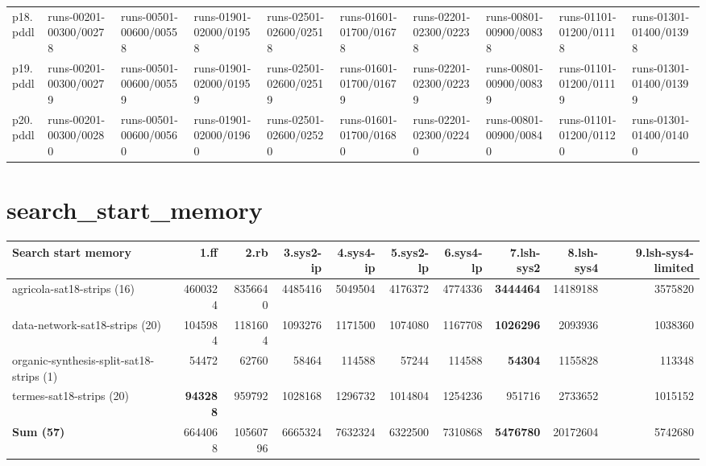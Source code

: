\documentclass{article}
\newcommand{\numtasks}[1]{\small{(#1)}}
\begin{document}
\begin{tabular}{@{}lrrrrrrrrr@{}}
p18.pddl & \multicolumn{1}{|l|}{runs-00201-00300/00278} & \multicolumn{1}{|l|}{runs-00501-00600/00558} & \multicolumn{1}{|l|}{runs-01901-02000/01958} & \multicolumn{1}{|l|}{runs-02501-02600/02518} & \multicolumn{1}{|l|}{runs-01601-01700/01678} & \multicolumn{1}{|l|}{runs-02201-02300/02238} & \multicolumn{1}{|l|}{runs-00801-00900/00838} & \multicolumn{1}{|l|}{runs-01101-01200/01118} & \multicolumn{1}{|l|}{runs-01301-01400/01398} \\
p19.pddl & \multicolumn{1}{|l|}{runs-00201-00300/00279} & \multicolumn{1}{|l|}{runs-00501-00600/00559} & \multicolumn{1}{|l|}{runs-01901-02000/01959} & \multicolumn{1}{|l|}{runs-02501-02600/02519} & \multicolumn{1}{|l|}{runs-01601-01700/01679} & \multicolumn{1}{|l|}{runs-02201-02300/02239} & \multicolumn{1}{|l|}{runs-00801-00900/00839} & \multicolumn{1}{|l|}{runs-01101-01200/01119} & \multicolumn{1}{|l|}{runs-01301-01400/01399} \\
p20.pddl & \multicolumn{1}{|l|}{runs-00201-00300/00280} & \multicolumn{1}{|l|}{runs-00501-00600/00560} & \multicolumn{1}{|l|}{runs-01901-02000/01960} & \multicolumn{1}{|l|}{runs-02501-02600/02520} & \multicolumn{1}{|l|}{runs-01601-01700/01680} & \multicolumn{1}{|l|}{runs-02201-02300/02240} & \multicolumn{1}{|l|}{runs-00801-00900/00840} & \multicolumn{1}{|l|}{runs-01101-01200/01120} & \multicolumn{1}{|l|}{runs-01301-01400/01400} \\
\end{tabular}

\hypertarget{search_start_memory}{}
\section*{search\_start\_memory}

\begin{tabular}{@{}lrrrrrrrrr@{}}
Search start memory & 1.ff & 2.rb & 3.sys2-ip & 4.sys4-ip & 5.sys2-lp & 6.sys4-lp & 7.lsh-sys2 & 8.lsh-sys4 & 9.lsh-sys4-limited \\
\midrule
agricola-sat18-strips \numtasks{16} & 4600324 & 8356640 & 4485416 & 5049504 & 4176372 & 4774336 & \textbf{3444464} & 14189188 & 3575820 \\
data-network-sat18-strips \numtasks{20} & 1045984 & 1181604 & 1093276 & 1171500 & 1074080 & 1167708 & \textbf{1026296} & 2093936 & 1038360 \\
organic-synthesis-split-sat18-strips \numtasks{1} & 54472 & 62760 & 58464 & 114588 & 57244 & 114588 & \textbf{54304} & 1155828 & 113348 \\
termes-sat18-strips \numtasks{20} & \textbf{943288} & 959792 & 1028168 & 1296732 & 1014804 & 1254236 & 951716 & 2733652 & 1015152 \\
\textbf{Sum \numtasks{57}} & 6644068 & 10560796 & 6665324 & 7632324 & 6322500 & 7310868 & \textbf{5476780} & 20172604 & 5742680 \\
\end{tabular}
\end{document}
